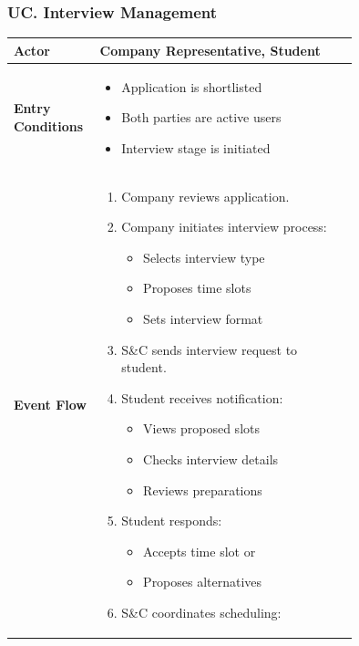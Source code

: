 \subsubsection*{UC\cuc . Interview Management}
\begin{center}
    \begin{longtable}{|l|p{0.75\linewidth}|}
        \hline
        \textbf{Actor}            & Company Representative, Student \\
        \hline
        \textbf{Entry Conditions} & 
        \begin{itemize}
            \item Application is shortlisted
            \item Both parties are active users
            \item Interview stage is initiated
        \end{itemize} \\
        \hline
        \textbf{Event Flow}       & 
        \begin{enumerate}
            \item Company reviews application.
            \item Company initiates interview process:
            \begin{itemize}
                \item Selects interview type
                \item Proposes time slots
                \item Sets interview format
            \end{itemize}
            \item S\&C sends interview request to student.
            \item Student receives notification:
            \begin{itemize}
                \item Views proposed slots
                \item Checks interview details
                \item Reviews preparations
            \end{itemize}
            \item Student responds:
            \begin{itemize}
                \item Accepts time slot or
                \item Proposes alternatives
            \end{itemize}
            \item S\&C coordinates scheduling:

\end{enumerate}
\end{longtable}
\end{center}
